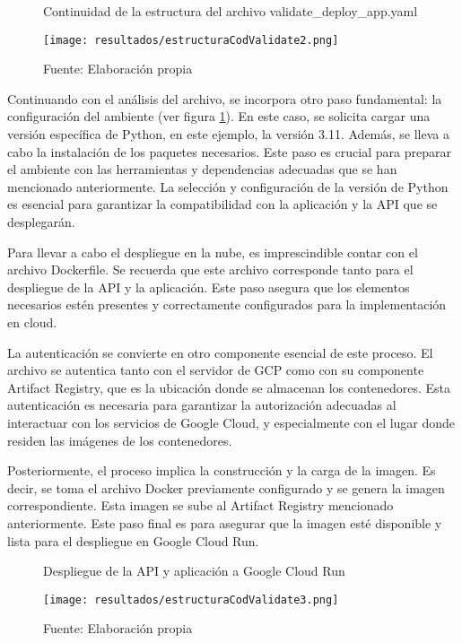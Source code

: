 \newpage

\begin{figure}[h]
	\centering
	\caption{Continuidad de la estructura del archivo validate\_deploy\_app.yaml}
	\texttt{[image: resultados/estructuraCodValidate2.png]}
	\caption*{\footnotesize Fuente: Elaboración propia}
	\label{fig:figuraEstructuraCodValidate2}
\end{figure}

Continuando con el análisis del archivo, se incorpora otro paso fundamental: la configuración del ambiente (ver figura \ref{fig:figuraEstructuraCodValidate2}). En este caso, se solicita cargar una versión específica de Python, en este ejemplo, la versión 3.11. Además, se lleva a cabo la instalación de los paquetes necesarios. Este paso es crucial para preparar el ambiente con las herramientas y dependencias adecuadas que se han mencionado anteriormente. La selección y configuración de la versión de Python es esencial para garantizar la compatibilidad con la aplicación y la API que se desplegarán. \newline

Para llevar a cabo el despliegue en la nube, es imprescindible contar con el archivo Dockerfile. Se recuerda que este archivo corresponde tanto para el despliegue de la API y la aplicación. Este paso asegura que los elementos necesarios estén presentes y correctamente configurados para la implementación en cloud.

\newpage

La autenticación se convierte en otro componente esencial de este proceso. El archivo se autentica tanto con el servidor de GCP como con su componente Artifact Registry, que es la ubicación donde se almacenan los contenedores. Esta autenticación es necesaria para garantizar la autorización adecuadas al interactuar con los servicios de Google Cloud, y especialmente con el lugar donde residen las imágenes de los contenedores.

Posteriormente, el proceso implica la construcción y la carga de la imagen. Es decir, se toma el archivo Docker previamente configurado y se genera la imagen correspondiente. Esta imagen se sube al Artifact Registry mencionado anteriormente. Este paso final es para asegurar que la imagen esté disponible y lista para el despliegue en Google Cloud Run.

\begin{figure}[h]
	\centering
	\caption{Despliegue de la API y aplicación a Google Cloud Run}
	\texttt{[image: resultados/estructuraCodValidate3.png]}
	\caption*{\footnotesize Fuente: Elaboración propia}
	\label{fig:figuraEstructuraCodValidate3}
\end{figure}

